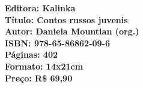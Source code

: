 \vfill

\hspace*{-.4cm}\begin{minipage}[c]{.5\linewidth}
\small\textbf{
\hspace*{-.1cm}Editora: Kalinka\\
Título: Contos russos juvenis\\
Autor: Daniela Mountian (org.)\\ 
ISBN: 978-65-86862-09-6\\
Páginas: 402\\
Formato: 14x21cm\\
Preço: R\$ 69,90
}
\end{minipage}

\pagebreak

\vspace*{1.5cm}


\bigskip

\hfill{}

\bigskip
\bigskip
\bigskip

\begin{multicols}{2}
\noindent{}\lipsum[1]

\lipsum[2]

\lipsum[4]

\lipsum[6]


\noindent{}\textcolor{gray}{\footnotesize{}}
\end{multicols}


\pagebreak 

\pagebreak
\pagestyle{kalinkacat}

